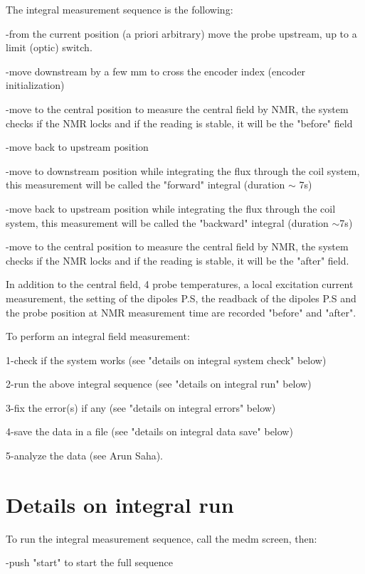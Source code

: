 {The integral measurement sequence is the following: 

-from the current position (a priori arbitrary) move the probe upstream, up
to a limit (optic) switch. 

-move downstream by a few mm to cross the encoder index (encoder initialization) 

-move to the central position to measure the central field by NMR, the system
checks if the NMR locks and if the reading is stable, it will be the 
"before"
field 

-move back to upstream position 

-move to downstream position while integrating the flux through the coil system,
this measurement will be called the "forward" integral (duration
\( \sim  \) 7s) 

-move back to upstream position while integrating the flux through the coil
system, this measurement will be called the "backward" integral
(duration \( \sim  \)7s) 

-move to the central position to measure the central field by NMR, the system
checks if the NMR locks and if the reading is stable, it will be the 
"after"
field. 

In addition to the central field, 4 probe temperatures, a local excitation current
measurement, the setting of the dipoles P.S, the readback of the dipoles P.S
and the probe position at NMR measurement time are recorded 
"before"
and "after". 

To perform an integral field measurement: 

1-check if the system works (see "details on integral system 
check"
below) 

2-run the above integral sequence (see "details on integral run"
below) 

3-fix the error(s) if any (see "details on integral errors"
below) 

4-save the data in a file (see "details on integral data save"
below) 

5-analyze the data (see Arun Saha). 


\section{Details on integral run }

To run the integral measurement sequence, call the 
medm screen, then: 

-push "start" to start the full sequence 

}
